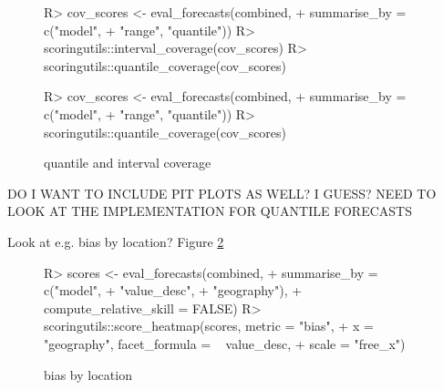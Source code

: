 \documentclass[article]{jss}
\begin{document}
\begin{figure}[h!]
\centering
\begin{Schunk}
\begin{Sinput}
R> cov_scores <- eval_forecasts(combined, 
+                               summarise_by = c("model", 
+                                                "range", "quantile"))
R> scoringutils::interval_coverage(cov_scores)
R> scoringutils::quantile_coverage(cov_scores)
\end{Sinput}
\end{Schunk}

\begin{Schunk}
\begin{Sinput}
R> cov_scores <- eval_forecasts(combined, 
+                               summarise_by = c("model", 
+                                                "range", "quantile"))
R> scoringutils::quantile_coverage(cov_scores)
\end{Sinput}
\end{Schunk}

\caption{\label{fig:coverage} quantile and interval coverage}
\end{figure}


DO I WANT TO INCLUDE PIT PLOTS AS WELL? I GUESS? NEED TO LOOK AT THE IMPLEMENTATION FOR QUANTILE FORECASTS

% 

Look at e.g. bias by location? Figure \ref{fig:bias-heatmap}

\begin{figure}[h]
\centering
\begin{Schunk}
\begin{Sinput}
R> scores <- eval_forecasts(combined, 
+                           summarise_by = c("model",
+                                            "value_desc", 
+                                            "geography"), 
+                           compute_relative_skill = FALSE)
R> scoringutils::score_heatmap(scores, metric = "bias", 
+                              x = "geography", facet_formula = ~ value_desc, 
+                              scale = "free_x")
\end{Sinput}
\end{Schunk}
\caption{\label{fig:bias-heatmap} bias by location}
\end{figure}
\end{document}

